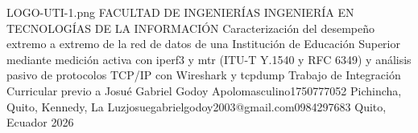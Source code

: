 \documentclass[12pt,a4paper,oneside]{report}
\begin{document}
\UTIPortada
{LOGO-UTI-1.png} %
{FACULTAD DE INGENIERÍAS} %
{INGENIERÍA EN TECNOLOGÍAS DE LA INFORMACIÓN} %
{Caracterización del desempeño extremo a extremo de la red de datos de una Institución de Educación Superior mediante medición activa con iperf3 y mtr (ITU-T Y.1540 y RFC 6349) y análisis pasivo de protocolos TCP/IP con Wireshark y tcpdump} %
{Trabajo de Integración Curricular previo a \UTIFraseTituloPortada} %
{\UTIDatosAutores
  {Josué Gabriel Godoy Apolo}{masculino}{1750777052}
  {Pichincha, Quito, Kennedy, La Luz}{josuegabrielgodoy2003@gmail.com}{0984297683}}
{} %
{Quito, Ecuador} %
{2026} %

\UTIFrontMatter


















\UTIMainMatter
\end{document}
